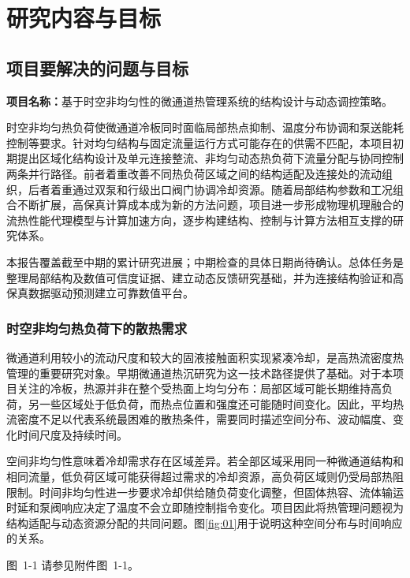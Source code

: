 \documentclass[UTF8]{midterm}
\makeatletter
\newcommand{\submissionnumber}[1]{\def\@currentlabel{#1}}
\makeatother
\begin{document}
\makecover
\section{研究内容与目标}

\subsection{项目要解决的问题与目标}

\textbf{项目名称：}基于时空非均匀性的微通道热管理系统的结构设计与动态调控策略。

时空非均匀热负荷使微通道冷板同时面临局部热点抑制、温度分布协调和泵送能耗控制等要求。针对均匀结构与固定流量运行方式可能存在的供需不匹配，本项目初期提出区域化结构设计及单元连接整流、非均匀动态热负荷下流量分配与协同控制两条并行路径。前者着重改善不同热负荷区域之间的结构适配及连接处的流动组织，后者着重通过双泵和行级出口阀门协调冷却资源。随着局部结构参数和工况组合不断扩展，高保真计算成本成为新的方法问题，项目进一步形成物理机理融合的流热性能代理模型与计算加速方向，逐步构建结构、控制与计算方法相互支撑的研究体系。

本报告覆盖截至中期的累计研究进展；中期检查的具体日期尚待确认。总体任务是整理局部结构及数值可信度证据、建立动态反馈研究基础，并为连接结构验证和高保真数据驱动预测建立可靠数值平台。

\subsubsection{时空非均匀热负荷下的散热需求}
微通道利用较小的流动尺度和较大的固液接触面积实现紧凑冷却，是高热流密度热管理的重要研究对象。早期微通道热沉研究为这一技术路径提供了基础\cite{tuckerman1981}。对于本项目关注的冷板，热源并非在整个受热面上均匀分布：局部区域可能长期维持高负荷，另一些区域处于低负荷，而热点位置和强度还可能随时间变化。因此，平均热流密度不足以代表系统最困难的散热条件，需要同时描述空间分布、波动幅度、变化时间尺度及持续时间。

空间非均匀性意味着冷却需求存在区域差异。若全部区域采用同一种微通道结构和相同流量，低负荷区域可能获得超过需求的冷却资源，高负荷区域则仍受局部热阻限制。时间非均匀性进一步要求冷却供给随负荷变化调整，但固体热容、流体输运时延和泵阀响应决定了温度不会立即随控制指令变化。项目因此将热管理问题视为结构适配与动态资源分配的共同问题。图\ref{fig:01}用于说明这种空间分布与时间响应的关系。

\par\noindent \begingroup\submissionnumber{1-1}\label{fig:01}\endgroup 图~1-1 请参见附件图~1-1。\par
\end{document}
